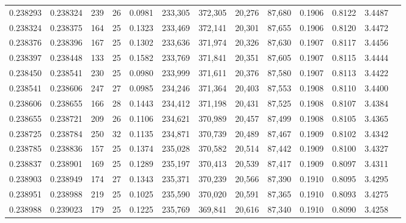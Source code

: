 \begin{tabular}{rrrrrrrrrrrrr}
0.238293 & 0.238324 &   239 &  26 &                                     0.0981 & 233,305 & 372,305 &  20,276 &  87,680 & 0.1906 & 0.8122 & 3.4487 \\
0.238324 & 0.238375 &   164 &  25 &                                     0.1323 & 233,469 & 372,141 &  20,301 &  87,655 & 0.1906 & 0.8120 & 3.4472 \\
0.238376 & 0.238396 &   167 &  25 &                                     0.1302 & 233,636 & 371,974 &  20,326 &  87,630 & 0.1907 & 0.8117 & 3.4456 \\
0.238397 & 0.238448 &   133 &  25 &                                     0.1582 & 233,769 & 371,841 &  20,351 &  87,605 & 0.1907 & 0.8115 & 3.4444 \\
0.238450 & 0.238541 &   230 &  25 &                                     0.0980 & 233,999 & 371,611 &  20,376 &  87,580 & 0.1907 & 0.8113 & 3.4422 \\
0.238541 & 0.238606 &   247 &  27 &                                     0.0985 & 234,246 & 371,364 &  20,403 &  87,553 & 0.1908 & 0.8110 & 3.4400 \\
0.238606 & 0.238655 &   166 &  28 &                                     0.1443 & 234,412 & 371,198 &  20,431 &  87,525 & 0.1908 & 0.8107 & 3.4384 \\
0.238655 & 0.238721 &   209 &  26 &                                     0.1106 & 234,621 & 370,989 &  20,457 &  87,499 & 0.1908 & 0.8105 & 3.4365 \\
0.238725 & 0.238784 &   250 &  32 &                                     0.1135 & 234,871 & 370,739 &  20,489 &  87,467 & 0.1909 & 0.8102 & 3.4342 \\
0.238785 & 0.238836 &   157 &  25 &                                     0.1374 & 235,028 & 370,582 &  20,514 &  87,442 & 0.1909 & 0.8100 & 3.4327 \\
0.238837 & 0.238901 &   169 &  25 &                                     0.1289 & 235,197 & 370,413 &  20,539 &  87,417 & 0.1909 & 0.8097 & 3.4311 \\
0.238903 & 0.238949 &   174 &  27 &                                     0.1343 & 235,371 & 370,239 &  20,566 &  87,390 & 0.1910 & 0.8095 & 3.4295 \\
0.238951 & 0.238988 &   219 &  25 &                                     0.1025 & 235,590 & 370,020 &  20,591 &  87,365 & 0.1910 & 0.8093 & 3.4275 \\
0.238988 & 0.239023 &   179 &  25 &                                     0.1225 & 235,769 & 369,841 &  20,616 &  87,340 & 0.1910 & 0.8090 & 3.4258 \\

\end{tabular}
